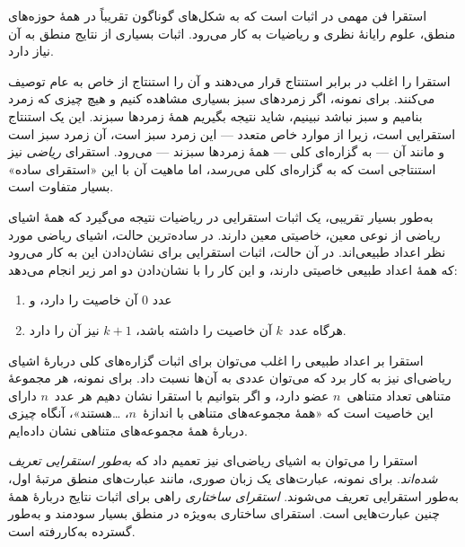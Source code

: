 \documentclass[../../../include/open-logic-section]{subfiles}
\begin{document}


استقرا فن مهمی در اثبات است که به شکل‌های گوناگون تقریباً در همهٔ
حوزه‌های منطق، علوم رایانهٔ نظری و ریاضیات به کار می‌رود. اثبات بسیاری
از نتایج منطق به آن نیاز دارد.

استقرا را اغلب در برابر استنتاج قرار می‌دهند و آن را استنتاج از خاص
به عام توصیف می‌کنند. برای نمونه، اگر زمردهای سبز بسیاری مشاهده کنیم
و هیچ چیزی که زمرد بنامیم و سبز نباشد نبینیم، شاید نتیجه بگیریم همهٔ
زمردها سبزند. این یک استنتاج استقرایی است، زیرا از موارد خاص متعدد
— این زمرد سبز است، آن زمرد سبز است و مانند آن — به گزاره‌ای کلی —
همهٔ زمردها سبزند — می‌رود. استقرای \emph{ریاضی} نیز استنتاجی است که
به گزاره‌ای کلی می‌رسد، اما ماهیت آن با این «استقرای ساده» بسیار
متفاوت است.

به‌طور بسیار تقریبی، یک اثبات استقرایی در ریاضیات نتیجه می‌گیرد که
همهٔ اشیای ریاضی از نوعی معین، خاصیتی معین دارند. در ساده‌ترین حالت،
اشیای ریاضی مورد نظر اعداد طبیعی‌اند. در آن حالت، اثبات استقرایی برای
نشان‌دادن این به کار می‌رود که همهٔ اعداد طبیعی خاصیتی دارند، و این
کار را با نشان‌دادن دو امر زیر انجام می‌دهد:
\begin{enumerate}
    \item عدد $0$ آن خاصیت را دارد، و
    \item هرگاه عدد~$k$ آن خاصیت را داشته باشد، $k+1$ نیز آن را دارد.
\end{enumerate}
استقرا بر اعداد طبیعی را اغلب می‌توان برای اثبات گزاره‌های کلی دربارهٔ
اشیای ریاضی‌ای نیز به کار برد که می‌توان عددی به آن‌ها نسبت داد. برای
نمونه، هر مجموعهٔ متناهی تعداد متناهی~$n$ عضو دارد، و اگر بتوانیم با
استقرا نشان دهیم هر عدد~$n$ دارای این خاصیت است که «همهٔ مجموعه‌های
متناهی با اندازهٔ~$n$، \dots هستند»، آنگاه چیزی دربارهٔ همهٔ مجموعه‌های
متناهی نشان داده‌ایم.

استقرا را می‌توان به اشیای ریاضی‌ای نیز تعمیم داد که
\emph{به‌طور استقرایی تعریف شده‌اند}. برای نمونه، عبارت‌های یک زبان
صوری، مانند عبارت‌های منطق مرتبهٔ اول، به‌طور استقرایی تعریف می‌شوند.
\emph{استقرای ساختاری} راهی برای اثبات نتایج دربارهٔ همهٔ چنین عبارت‌هایی
است. استقرای ساختاری به‌ویژه در منطق بسیار سودمند و به‌طور گسترده
به‌کاررفته است.
\end{document}
